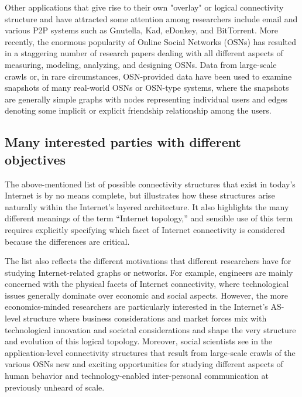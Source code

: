 Other applications that give rise to their own "overlay" or logical
connectivity structure and have attracted some attention among
researchers include email and various P2P systems such as Gnutella,
Kad, eDonkey, and BitTorrent.  More
recently, the enormous popularity of Online Social Networks (OSNs) has
resulted in a staggering number of research papers dealing with all
different aspects of measuring, modeling, analyzing, and designing
OSNs.  Data from large-scale crawls or, in rare
circumstances, OSN-provided data have been used to examine snapshots
of many real-world OSNs or OSN-type systems, where the snapshots are
generally simple graphs with nodes representing individual users and
edges denoting some implicit or explicit friendship relationship among
the users.

\subsection{Many interested parties with different objectives}

The above-mentioned list of possible connectivity structures that
exist in today's Internet is by no means complete, but illustrates how
these structures arise naturally within the Internet's layered
architecture. It also highlights the many different meanings of the
term ``Internet topology,'' and sensible use of this term requires
explicitly specifying which facet of Internet connectivity is
considered because the differences are critical.

The list also reflects the different motivations that different
researchers have for studying Internet-related graphs or networks.
For example, engineers are mainly concerned with the physical facets
of Internet connectivity, where technological issues generally
dominate over economic and social aspects.  However, the more
economics-minded researchers are particularly interested in the
Internet's AS-level structure where business considerations and market
forces mix with technological innovation and societal considerations
and shape the very structure and evolution of this logical topology.
Moreover, social scientists see in the application-level connectivity
structures that result from large-scale crawls of the various OSNs new
and exciting opportunities for studying different aspects of human
behavior and technology-enabled inter-personal communication at
previously unheard of scale.

